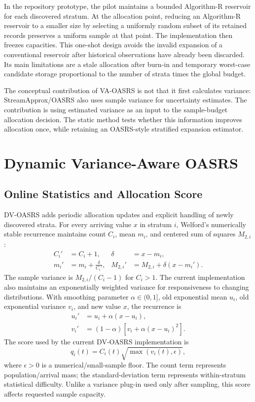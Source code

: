 \documentclass[11pt]{article}
\begin{document}
In the repository prototype, the pilot maintains a bounded Algorithm-R reservoir for each discovered stratum. At the allocation point, reducing an Algorithm-R reservoir to a smaller size by selecting a uniformly random subset of its retained records preserves a uniform sample at that point. The implementation then freezes capacities. This one-shot design avoids the invalid expansion of a conventional reservoir after historical observations have already been discarded. Its main limitations are a stale allocation after burn-in and temporary worst-case candidate storage proportional to the number of strata times the global budget.

The conceptual contribution of VA-OASRS is not that it first calculates variance: StreamApprox/OASRS also uses sample variance for uncertainty estimates. The contribution is using estimated variance as an input to the sample-budget allocation decision. The static method tests whether this information improves allocation once, while retaining an OASRS-style stratified expansion estimator.

\section{Dynamic Variance-Aware OASRS}

\subsection{Online Statistics and Allocation Score}

DV-OASRS adds periodic allocation updates and explicit handling of newly discovered strata. For every arriving value $x$ in stratum $i$, Welford's numerically stable recurrence maintains count $C_i$, mean $m_i$, and centered sum of squares $M_{2,i}$:
\begin{align}
 C_i'&=C_i+1, & \delta&=x-m_i,\\
 m_i'&=m_i+\frac{\delta}{C_i'}, &
 M_{2,i}'&=M_{2,i}+\delta(x-m_i').
\end{align}
The sample variance is $M_{2,i}/(C_i-1)$ for $C_i>1$. The current implementation also maintains an exponentially weighted variance for responsiveness to changing distributions. With smoothing parameter $\alpha\in(0,1]$, old exponential mean $u_i$, old exponential variance $v_i$, and new value $x$, the recurrence is
\begin{align}
 u_i' &=u_i+\alpha(x-u_i),\\
 v_i' &=(1-\alpha)\left[v_i+\alpha(x-u_i)^2\right].
\end{align}
The score used by the current DV-OASRS implementation is
\begin{equation}
 q_i(t)=C_i(t)\sqrt{\max(v_i(t),\epsilon)},
 \label{eq:dynamic-score}
\end{equation}
where $\epsilon>0$ is a numerical/small-sample floor. The count term represents population/arrival mass; the standard-deviation term represents within-stratum statistical difficulty. Unlike a variance plug-in used only after sampling, this score affects requested sample capacity.
\end{document}
